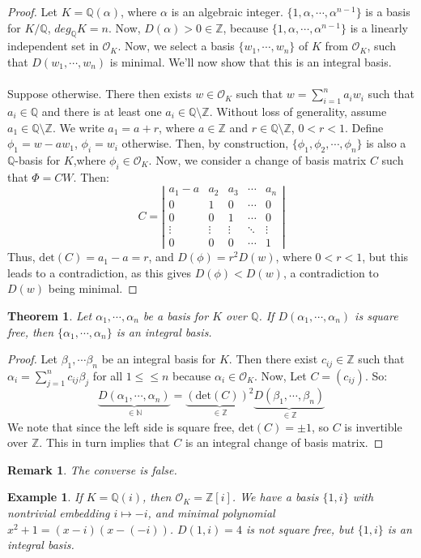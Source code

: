 \documentclass{article}
\newcommand{\N}{\mathbb{N}}
\newcommand{\air}{\mathcal{O}_K}
\newcommand{\Q}{\mathbb{Q}}
\newcommand{\Z}{\mathbb{Z}}
\newtheorem{theorem}{Theorem}
\newtheorem{remark}{Remark}
\newtheorem{example}{Example}
\begin{document}
\begin{proof}
Let $K=\Q(\alpha)$, where $\alpha$ is an algebraic integer. $\{1,\alpha,\cdots, \alpha^{n-1}\}$ is a basis for $K/\Q$, $deg_\Q K=n$. Now, $D(\alpha)>0 \in\Z$, because $\{1,\alpha,\cdots, \alpha^{n-1}\}$ is a linearly independent set in $\air$. Now, we select a basis $\{w_1,\cdots, w_n\}$ of $K$ from $\air$, such that $D(w_1,\cdots, w_n)$ is minimal. We'll now show that this is an integral basis. \\
\\
Suppose otherwise. There then exists $w\in\air$ such that $w=\displaystyle\sum_{i=1}^n a_iw_i$ such that $a_i\in\Q$ and there is at least one $a_i\in \Q\setminus \Z$. Without loss of generality, assume $a_1\in \Q\setminus \Z$. We write $a_1=a+r$, where $a\in\Z$ and $r\in \Q\setminus \Z$, $0<r<1$. Define $\phi_1=w-aw_1$, $\phi_i=w_i$ otherwise. Then, by construction, $\{\phi_1,\phi_2,\cdots, \phi_n\}$ is also a $\Q$-basis for $K$,where $\phi_i\in\air$. Now, we consider a change of basis matrix $C$ such that $\Phi=CW$. Then:
$$C=\left|\begin{array}{ccccc}
   a_1-a  & a_2 & a_3 &\cdots &a_n \\
   0  & 1 & 0 &\cdots &0\\
   0 & 0 & 1 & \cdots &0\\
   \vdots & \vdots &\vdots &\ddots &\vdots\\
   0 & 0 & 0 & \cdots & 1
\end{array}\right|$$
Thus, $\text{det}(C)=a_1-a=r$, and $D(\phi)=r^2D(w)$, where $0<r<1$, but this leads to a contradiction, as this gives $D(\phi)<D(w)$, a contradiction to $D(w)$ being minimal.
\end{proof}
\begin{theorem}
Let $\alpha_1,\cdots, \alpha_n$ be a basis for $K$ over $\Q$. If $D(\alpha_1,\cdots, \alpha_n)$ is square free, then $\{\alpha_1,\cdots, \alpha_n\}$ is an integral basis.
\end{theorem}
\begin{proof}
Let $\beta_1,\cdots \beta_n$ be an integral basis for $K$. Then there exist $c_{ij}\in\Z$ such that $\alpha_i=\displaystyle\sum_{j=1}^n c_{ij}\beta_j$ for all $1\leq \leq n$ because $\alpha_i\in\air$. Now, Let $C=(c_{ij})$. So:
$$\underbrace{D(\alpha_1,\cdots, \alpha_n)}_{\in\N}=\underbrace{(\text{det}(C))^2}_{\in\Z}\underbrace{D(\beta_1,\cdots, \beta_n)}_{\in\Z}$$
We note that since the left side is square free, $\text{det}(C)=\pm 1$, so $C$ is invertible over $\Z.$ This in turn implies that $C$ is an integral change of basis matrix.
\end{proof}
\begin{remark}
The converse is false.
\end{remark}
\begin{example}
If $K=\Q(i)$, then $\air = \Z[i]$. We have a basis $\{1,i\}$ with nontrivial embedding $i\mapsto -i$, and minimal polynomial $x^2+1=(x-i)(x-(-i))$. $D(1,i)=4$ is not square free, but $\{1,i\}$ is an integral basis.
\end{example}
\end{document}
